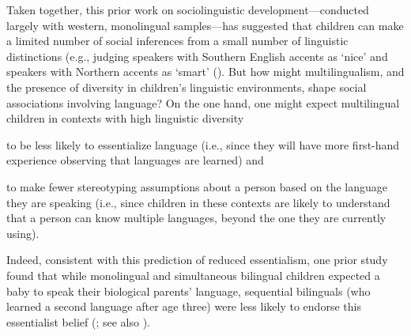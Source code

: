 \documentclass{foushee-adapted-preprint}
\begin{document}
Taken together, this prior work on sociolinguistic development---conducted largely with western, monolingual samples---has suggested that children can make a limited number of social inferences from a small number of linguistic distinctions (e.g., judging speakers with Southern English accents as `nice' and speakers with Northern accents as `smart' (\cite{kinzler2013northern}). But how might multilingualism, and the presence of diversity in children's linguistic environments, shape social associations involving language? On the one hand, one might expect multilingual children in contexts with high linguistic diversity 
\begin{inparaenum}[(1)]
    \item to be less likely to essentialize language (i.e., since they will have more first-hand experience observing that languages are learned) and
    \item to make fewer stereotyping assumptions about a person based on the language they are speaking (i.e., since children in these contexts are likely to understand that a person can know multiple languages, beyond the one they are currently using).
\end{inparaenum} Indeed, consistent with this prediction of reduced essentialism, one prior study found that while monolingual and simultaneous bilingual children expected a baby to speak their biological parents' language, sequential bilinguals (who learned a second language after age three) were less likely to endorse this essentialist belief (\cite{byers2015bilingualism}; see also \cite{dautel2018once}).
\end{document}
